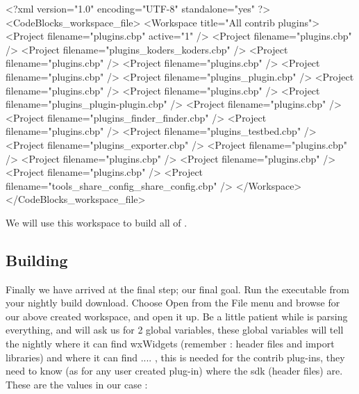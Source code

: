 \begin{code}
<?xml version="1.0" encoding="UTF-8" standalone="yes" ?>
<CodeBlocks_workspace_file>
	<Workspace title="All contrib plugins">
		<Project filename="plugins\contrib\AutoVersioning\AutoVersioning.cbp" active="1" />
		<Project filename="plugins\contrib\byogames\byogames.cbp" />
		<Project filename="plugins\contrib\cb_koders\cb_koders.cbp" />
		<Project filename="plugins\contrib\codesnippets\codesnippets.cbp" />
		<Project filename="plugins\contrib\codestat\codestat.cbp" />
		<Project filename="plugins\contrib\copystrings\copystrings.cbp" />
		<Project filename="plugins\contrib\devpak_plugin\DevPakPlugin.cbp" />
		<Project filename="plugins\contrib\dragscroll\dragscroll.cbp" />
		<Project filename="plugins\contrib\envvars\envvars.cbp" />
		<Project filename="plugins\contrib\help_plugin\help-plugin.cbp" />
		<Project filename="plugins\contrib\keybinder\keybinder.cbp" />
		<Project filename="plugins\contrib\lib_finder\lib_finder.cbp" />
		<Project filename="plugins\contrib\profiler\cbprofiler.cbp" />
		<Project filename="plugins\contrib\regex_testbed\RegExTestbed.cbp" />
		<Project filename="plugins\contrib\source_exporter\Exporter.cbp" />
		<Project filename="plugins\contrib\symtab\symtab.cbp" />
		<Project filename="plugins\contrib\ThreadSearch\ThreadSearch.cbp" />
		<Project filename="plugins\contrib\wxSmith\wxSmith.cbp" />
		<Project filename="plugins\contrib\wxSmithContribItems\wxSmithContribItems.cbp" />
		<Project filename="tools\cb_share_config\cb_share_config.cbp" />
	</Workspace>
</CodeBlocks_workspace_file>
\end{code}

We will use this workspace to build all of \codeblocks.

\subsection{Building \codeblocks}

Finally we have arrived at the final step; our final goal. Run the \codeblocks executable from your nightly build download. Choose Open from the File menu and browse for our above created workspace, and open it up. Be a little patient while \codeblocks is parsing everything, and \codeblocks will ask us for 2 global variables, these global variables will tell the nightly \codeblocks where it can find wxWidgets (remember : header files and import libraries) and where it can find .... \codeblocks, this is needed for the contrib plug-ins, they need to know (as for any user created plug-in) where the sdk (\codeblocks header files) are. These are the values in our case :

